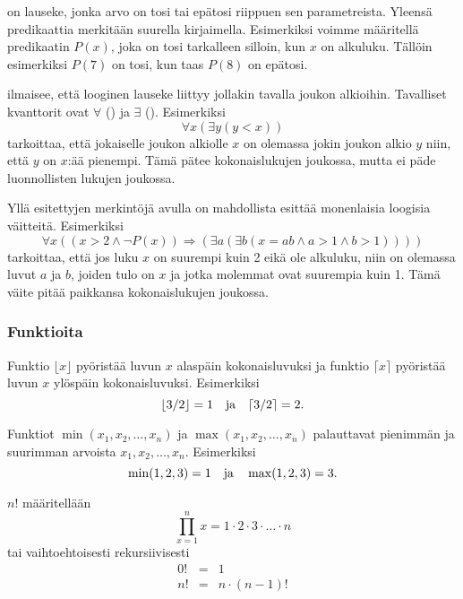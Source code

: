 
 on lauseke, jonka arvo on tosi tai epätosi
riippuen sen parametreista.
Yleensä predikaattia merkitään suurella kirjaimella.
Esimerkiksi voimme määritellä predikaatin $P(x)$,
joka on tosi tarkalleen silloin, kun $x$ on alkuluku.
Tällöin esimerkiksi $P(7)$ on tosi, kun taas $P(8)$ on epätosi.


 ilmaisee, että looginen
lauseke liittyy jollakin tavalla joukon alkioihin.
Tavalliset kvanttorit
ovat $\forall$ () ja $\exists$ ().
Esimerkiksi
\[\forall x (\exists y (y < x))\]
tarkoittaa, että jokaiselle joukon
alkiolle $x$ on olemassa
jokin joukon alkio $y$ niin, että $y$ on $x$:ää pienempi.
Tämä pätee kokonaislukujen joukossa,
mutta ei päde luonnollisten lukujen joukossa.

Yllä esitettyjen merkintöjä avulla on mahdollista esittää
monenlaisia loogisia väitteitä.
Esimerkiksi
\[\forall x ((x>2 \land \lnot P(x)) \Rightarrow (\exists a (\exists b (x = ab \land a > 1 \land b > 1))))\]
tarkoittaa, että jos luku $x$ on suurempi
kuin 2 eikä ole alkuluku,
niin on olemassa luvut $a$ ja $b$,
joiden tulo on $x$ ja jotka molemmat ovat suurempia kuin 1.
Tämä väite pitää paikkansa kokonaislukujen joukossa.

\subsubsection{Funktioita}

Funktio $\lfloor x \rfloor$ pyöristää luvun $x$
alaspäin kokonaisluvuksi ja
funktio $\lceil x \rceil$ pyöristää luvun $x$
ylöspäin kokonaisluvuksi. Esimerkiksi
\[ \lfloor 3/2 \rfloor = 1 \hspace{10px} \textrm{ja} \hspace{10px} \lceil 3/2 \rceil = 2.\]

Funktiot $\min(x_1,x_2,\ldots,x_n)$
ja $\max(x_1,x_2,\ldots,x_n)$
palauttavat pienimmän ja suurimman
arvoista $x_1,x_2,\ldots,x_n$.
Esimerkiksi
\[ \min(1,2,3)=1 \hspace{10px} \textrm{ja} \hspace{10px} \max(1,2,3)=3.\]


 $n!$ määritellään
\[\prod_{x=1}^n x = 1 \cdot 2 \cdot 3 \cdot \ldots \cdot n\]
tai vaihtoehtoisesti rekursiivisesti
\[
\begin{array}{lcl}
0! & = & 1 \\
n! & = & n \cdot (n-1)! \\
\end{array}
\]

